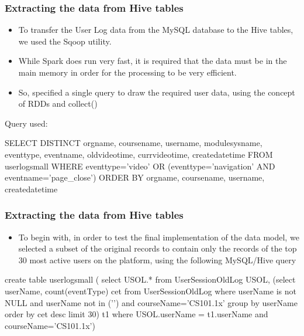 \documentclass[12pt,xcolor=dvipsnames]{beamer}
\begin{document}

\begin{frame}[t]
\frametitle{Extracting the data from Hive tables}

\begin{itemize}

\item To transfer the User Log data from the MySQL database to the Hive tables, we used the Sqoop utility.

\item While Spark does run very fast, it is required that the data must be in the main memory 
in order for the processing to be very efficient.

\item So, specified a single query to draw the required user data, using
the concept of RDDs and collect()

\end{itemize}

Query used: 

\begin{tiny}
SELECT DISTINCT orgname, coursename, username, modulesysname,
eventtype, eventname, oldvideotime, currvideotime, createdatetime
FROM userlogsmall
WHERE eventtype=’video’ OR (eventtype=’navigation’ AND eventname=’page\_close’)
ORDER BY orgname, coursename, username, createdatetime
\end{tiny}


\end{frame}



\begin{frame}[t]
\frametitle{Extracting the data from Hive tables}
\vfill
\begin{itemize}

\item To begin with, in order to test the final implementation of the data model, we selected a subset of
the original records to contain only the records of the top 30 most active users on the platform, using
the following MySQL/Hive query

\end{itemize}

\begin{tiny}
create table userlogsmall (
select USOL.* from UserSessionOldLog USOL,
(select userName, count(eventType) cet
from UserSessionOldLog
where userName is not NULL and userName not in (’’)
and courseName=’CS101.1x’ group by userName
order by cet desc limit 30) t1
where USOL.userName = t1.userName and courseName=’CS101.1x’)
\end{tiny}
\end{frame}
\end{document}
